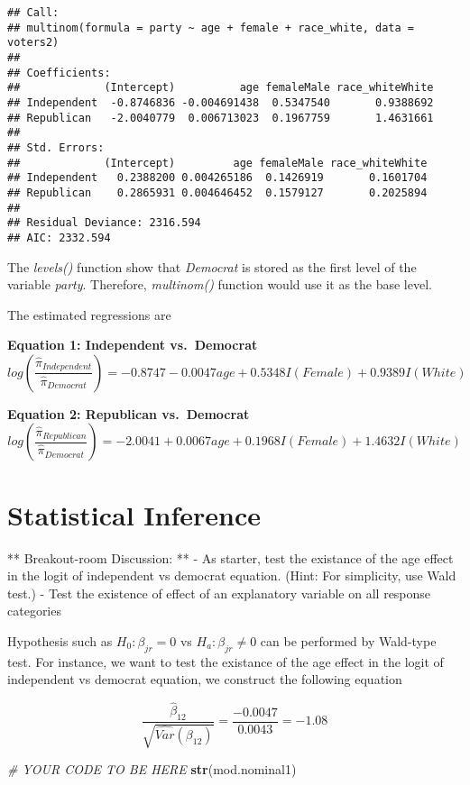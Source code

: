 \documentclass[]{article}
\newenvironment{Shaded}{\begin{snugshade}}{\end{snugshade}}
\newcommand{\KeywordTok}[1]{\textcolor[rgb]{0.13,0.29,0.53}{\textbf{{#1}}}}
\newcommand{\CommentTok}[1]{\textcolor[rgb]{0.56,0.35,0.01}{\textit{{#1}}}}
\newcommand{\NormalTok}[1]{{#1}}
\begin{document}
\begin{verbatim}
## Call:
## multinom(formula = party ~ age + female + race_white, data = voters2)
## 
## Coefficients:
##             (Intercept)          age femaleMale race_whiteWhite
## Independent  -0.8746836 -0.004691438  0.5347540       0.9388692
## Republican   -2.0040779  0.006713023  0.1967759       1.4631661
## 
## Std. Errors:
##             (Intercept)         age femaleMale race_whiteWhite
## Independent   0.2388200 0.004265186  0.1426919       0.1601704
## Republican    0.2865931 0.004646452  0.1579127       0.2025894
## 
## Residual Deviance: 2316.594 
## AIC: 2332.594
\end{verbatim}

The \emph{levels()} function show that \emph{Democrat} is stored as the
first level of the variable \emph{party}. Therefore, \emph{multinom()}
function would use it as the base level.

The estimated regressions are

\textbf{Equation 1: Independent vs.~Democrat} \[
log \left( \frac{\widehat{\pi}_{Independent}}{\widehat{\pi}_{Democrat}} \right) = -0.8747 - 0.0047age + 0.5348I(Female) + 0.9389I(White)
\]

\textbf{Equation 2: Republican vs.~Democrat} \[
log \left( \frac{\widehat{\pi}_{Republican}}{\widehat{\pi}_{Democrat}} \right) = -2.0041 + 0.0067age + 0.1968I(Female) + 1.4632I(White)
\]

\section{Statistical Inference}\label{statistical-inference}

** Breakout-room Discussion: ** - As starter, test the existance of the
age effect in the logit of independent vs democrat equation. (Hint: For
simplicity, use Wald test.) - Test the existence of effect of an
explanatory variable on all response categories

Hypothesis such as \(H_0: \beta_{jr}=0\) vs \(H_a: \beta_{jr} \ne 0\)
can be performed by Wald-type test. For instance, we want to test the
existance of the age effect in the logit of independent vs democrat
equation, we construct the following equation

\[
\frac{\hat{\beta}_{12}}{\sqrt{\widehat{Var}(\beta_{12})}} = \frac{-0.0047}{0.0043} = -1.08
\]

\begin{Shaded}
\begin{Highlighting}[]
\CommentTok{# YOUR CODE TO BE HERE}
\KeywordTok{str}\NormalTok{(mod.nominal1)}
\end{Highlighting}
\end{Shaded}
\end{document}
